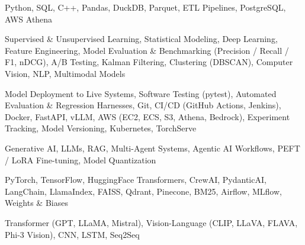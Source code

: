 \documentclass[letter,10pt]{article}
\begin{document}
 Python, SQL, C++, Pandas, DuckDB, Parquet, ETL Pipelines, PostgreSQL, AWS Athena\par\vspace{2pt}

 Supervised \& Unsupervised Learning, Statistical Modeling, Deep Learning, Feature Engineering, Model Evaluation \& Benchmarking (Precision / Recall / F1, nDCG), A/B Testing, Kalman Filtering, Clustering (DBSCAN), Computer Vision, NLP, Multimodal Models\par\vspace{2pt}

 Model Deployment to Live Systems, Software Testing (pytest), Automated Evaluation \& Regression Harnesses, Git, CI/CD (GitHub Actions, Jenkins), Docker, FastAPI, vLLM, AWS (EC2, ECS, S3, Athena, Bedrock), Experiment Tracking, Model Versioning, Kubernetes, TorchServe\par\vspace{2pt}

 Generative AI, LLMs, RAG, Multi-Agent Systems, Agentic AI Workflows, PEFT / LoRA Fine-tuning, Model Quantization\par\vspace{2pt}

 PyTorch, TensorFlow, HuggingFace Transformers, CrewAI, PydanticAI, LangChain, LlamaIndex, FAISS, Qdrant, Pinecone, BM25, Airflow, MLflow, Weights \& Biases\par\vspace{2pt}

 Transformer (GPT, LLaMA, Mistral), Vision-Language (CLIP, LLaVA, FLAVA, Phi-3 Vision), CNN, LSTM, Seq2Seq
\end{document}
